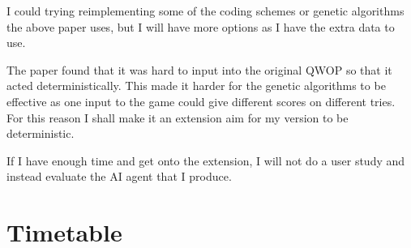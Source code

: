 \documentclass[12pt,a4paper,twoside]{article}
\begin{document}
I could trying reimplementing some of the coding schemes or genetic algorithms the above paper uses, but I will have more options as I have the extra data to use.

The paper found that it was hard to input into the original QWOP so that it acted deterministically.
This made it harder for the genetic algorithms to be effective as one input to the game could give different scores on different tries.
For this reason I shall make it an extension aim for my version to be deterministic.

If I have enough time and get onto the extension, I will not do a user study and instead evaluate the AI agent that I produce.


\section*{Timetable}


\end{document}
